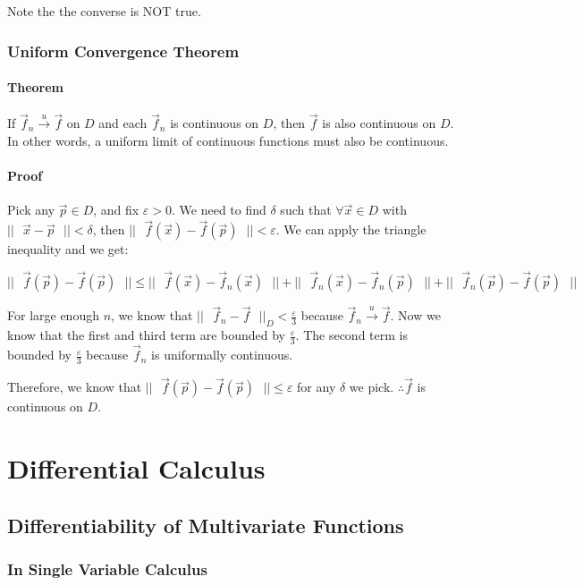 \documentclass [12 pt, twoside] {book}
\newcommand\+{\text{ }}
\newcommand{\uconv}{\overset{u}{\to}}
\begin{document}
Note the the converse is NOT true.

\subsection{Uniform Convergence Theorem}
\subsubsection{Theorem}

If $\vec{f}_n \uconv \vec{f}$ on $D$ and each $\vec{f}_n$ is continuous on $D$,
then $\vec{f}$ is also continuous on $D$. In other words, a uniform limit of
continuous functions must also be continuous.

\subsubsection{Proof}

Pick any $\vec{p} \in D$, and fix $\varepsilon > 0$. We need to find $\delta$
such that $\forall \vec{x} \in D$ with $||\+\vec{x} - \vec{p}\+|| < \delta$,
then $||\+\vec{f}(\vec{x}) - \vec{f}(\vec{p})\+|| < \varepsilon$. 
We can apply the triangle inequality and we get:

$$||\+\vec{f}(\vec{p}) - \vec{f}(\vec{p})\+|| \leq ||\+\vec{f}(\vec{x}) -
\vec{f}_n(\vec{x})\+|| + ||\+\vec{f}_n(\vec{x}) - \vec{f}_n(\vec{p})\+|| +
||\+\vec{f}_n(\vec{p}) - \vec{f}(\vec{p})\+||$$

For large enough $n$, we know that $||\+\vec{f}_n - \vec{f}\+||_D < \frac{\varepsilon}{3}$
because $\vec{f}_n \uconv \vec{f}$. Now we know that the first and third term
are bounded by $\frac{\varepsilon}{3}$. The second term is bounded by
$\frac{\varepsilon}{3}$ because $\vec{f}_n$ is uniformally continuous.

Therefore, we know that $||\+\vec{f}(\vec{p}) - \vec{f}(\vec{p})\+|| \leq
\varepsilon$ for any $\delta$ we pick. $\therefore \vec{f}$ is continuous on
$D$.
\chapter{Differential Calculus}
\section{Differentiability of Multivariate Functions}
\subsection{In Single Variable Calculus}
\end{document}
